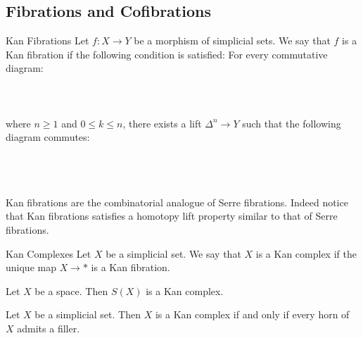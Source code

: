 \documentclass[a4paper]{article}
\begin{document}
\subsection{Fibrations and Cofibrations}
\begin{defn}{Kan Fibrations}{} Let $f:X\to Y$ be a morphism of simplicial sets. We say that $f$ is a Kan fibration if the following condition is satisfied: For every commutative diagram: \\~\\
\\~\\
where $n\geq 1$ and $0\leq k\leq n$, there exists a lift $\Delta^n\to Y$ such that the following diagram commutes: \\~\\
\\~\\
\end{defn}

Kan fibrations are the combinatorial analogue of Serre fibrations. Indeed notice that Kan fibrations satisfies a homotopy lift property similar to that of Serre fibrations. 

\begin{defn}{Kan Complexes}{} Let $X$ be a simplicial set. We say that $X$ is a Kan complex if the unique map $X\to\ast$ is a Kan fibration. 
\end{defn}

\begin{lmm}{}{} Let $X$ be a space. Then $S(X)$ is a Kan complex. 
\end{lmm}

\begin{thm}{}{} Let $X$ be a simplicial set. Then $X$ is a Kan complex if and only if every horn of $X$ admits a filler. 
\end{thm}
\end{document}
